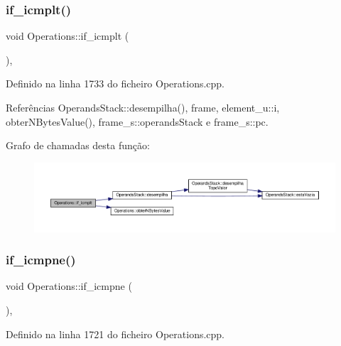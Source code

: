 \subsubsection{\texorpdfstring{if\+\_\+icmplt()}{if\_icmplt()}}
{\footnotesize\ttfamily void Operations\+::if\+\_\+icmplt (\begin{DoxyParamCaption}{ }\end{DoxyParamCaption})\hspace{0.3cm}{\ttfamily [static]}, {\ttfamily [private]}}



Definido na linha 1733 do ficheiro Operations.\+cpp.



Referências Operands\+Stack\+::desempilha(), frame, element\+\_\+u\+::i, obter\+N\+Bytes\+Value(), frame\+\_\+s\+::operands\+Stack e frame\+\_\+s\+::pc.

Grafo de chamadas desta função\+:\nopagebreak
\begin{figure}[H]
\begin{center}
\leavevmode
\includegraphics[width=350pt]{classOperations_a06f624059cfada3f4a726d0482078aaa_cgraph}
\end{center}
\end{figure}
\mbox{\label{classOperations_a52dca630766e37bbaf0e7439c0335273}} 
\subsubsection{\texorpdfstring{if\+\_\+icmpne()}{if\_icmpne()}}
{\footnotesize\ttfamily void Operations\+::if\+\_\+icmpne (\begin{DoxyParamCaption}{ }\end{DoxyParamCaption})\hspace{0.3cm}{\ttfamily [static]}, {\ttfamily [private]}}



Definido na linha 1721 do ficheiro Operations.\+cpp.



